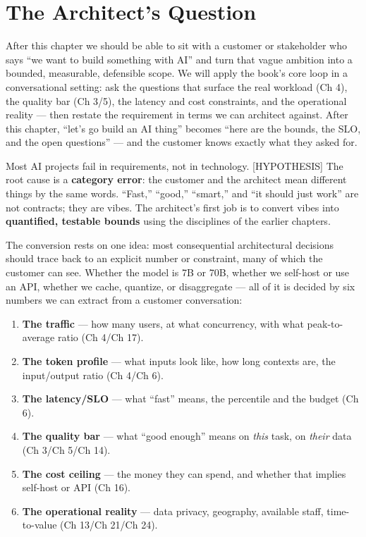 \section*{The Architect's Question}\label{the-architects-question}

After this chapter we should be able to sit with a customer or
stakeholder who says ``we want to build something with AI'' and turn
that vague ambition into a bounded, measurable, defensible scope. We
will apply the book's core loop in a conversational setting: ask the
questions that surface the real workload (Ch 4), the quality bar (Ch
3/5), the latency and cost constraints, and the operational reality ---
then restate the requirement in terms we can architect against. After
this chapter, ``let's go build an AI thing'' becomes ``here are the
bounds, the SLO, and the open questions'' --- and the customer knows
exactly what they asked for.

\label{concept}


Most AI projects fail in requirements, not in technology.
\mbox{{[}HYPOTHESIS{]}} The root cause is a \textbf{category error}: the
customer and the architect mean different things by the same words.
``Fast,'' ``good,'' ``smart,'' and ``it should just work'' are not
contracts; they are vibes. The architect's first job is to convert vibes
into \textbf{quantified, testable bounds} using the disciplines of the
earlier chapters.

The conversion rests on one idea: most consequential architectural
decisions should trace back to an explicit number or constraint, many of
which the customer can see. Whether the model is 7B or 70B, whether we
self-host or use an API, whether we cache, quantize, or disaggregate ---
all of it is decided by six numbers we can extract from a customer
conversation:

\begin{enumerate}
\def\labelenumi{\arabic{enumi}.}
\tightlist
\item
  \textbf{The traffic} --- how many users, at what concurrency, with
  what peak-to-average ratio (Ch 4/Ch 17).
\item
  \textbf{The token profile} --- what inputs look like, how long
  contexts are, the input/output ratio (Ch 4/Ch 6).
\item
  \textbf{The latency/SLO} --- what ``fast'' means, the percentile and
  the budget (Ch 6).
\item
  \textbf{The quality bar} --- what ``good enough'' means on \emph{this}
  task, on \emph{their} data (Ch 3/Ch 5/Ch 14).
\item
  \textbf{The cost ceiling} --- the money they can spend, and whether
  that implies self-host or API (Ch 16).
\item
  \textbf{The operational reality} --- data privacy, geography,
  available staff, time-to-value (Ch 13/Ch 21/Ch 24).
\end{enumerate}

